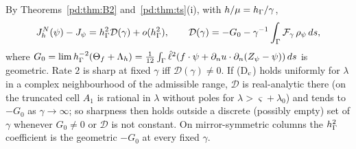 \begin{corollary}\label{pd:cor:drag}
By Theorems~\ref{pd:thm:B2} and~\ref{pd:thm:ts}(i), with $h/\mu=h_\Gamma/\gamma$,
\[
J^N_h(\psi)-J_\psi=h_\Gamma^2\mathcal D(\gamma)+o(h_\Gamma^2),\qquad \mathcal D(\gamma)=-G_0-\gamma^{-1}\int_\Gamma\mathcal F_\gamma\,\rho_\psi\,ds,
\]
where $G_0=\lim h_\Gamma^{-2}(\Theta_f+\Lambda_h)=\frac1{12}\int_\Gamma\hat\ell^2(f\cdot\psi+\partial_n u\cdot\partial_n(Z_\psi-\psi))\,ds$ is geometric. Rate $2$ is sharp at fixed $\gamma$ iff $\mathcal D(\gamma)\ne0$. If (D$_{\rm c}$) holds uniformly for $\lambda$ in a complex neighbourhood of the admissible range, $\mathcal D$ is real-analytic there (on the truncated cell $A_1$ is rational in $\lambda$ without poles for $\lambda>\varsigma+\lambda_0$) and tends to $-G_0$ as $\gamma\to\infty$; so sharpness then holds outside a discrete (possibly empty) set of $\gamma$ whenever $G_0\ne0$ or $\mathcal D$ is not constant. On mirror-symmetric columns the $h_\Gamma^2$ coefficient is the geometric $-G_0$ at every fixed $\gamma$.
\end{corollary}

\begin{table}[h]\centering\footnotesize
\caption{Annulus meshes (exactly LPC), test S$_1$ ($\kappa=1$, $W=2(1+\cos\theta)$): cell values and first-order Richardson extrapolations $2f(128)-f(64)$ divided by the prediction of Theorem~\ref{pd:thm:ts} (\texttt{notes/v7/P/compare\_ann.log}).}\label{pd:tab:cell}
\end{table}

